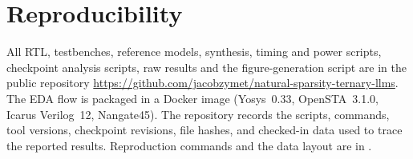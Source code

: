 \documentclass[11pt]{article}
\begin{document}
\section*{Reproducibility}

All RTL, testbenches, reference models, synthesis, timing and power scripts,
checkpoint analysis scripts, raw results and the figure-generation script are
in the public repository
\url{https://github.com/jacobzymet/natural-sparsity-ternary-llms}. The EDA flow is packaged in a
Docker image (Yosys~0.33, OpenSTA~3.1.0, Icarus Verilog~12, Nangate45). The repository records the scripts, commands, tool versions, checkpoint
revisions, file hashes, and checked-in data used to trace the reported results. Reproduction commands and the data layout are in
.



\end{document}
